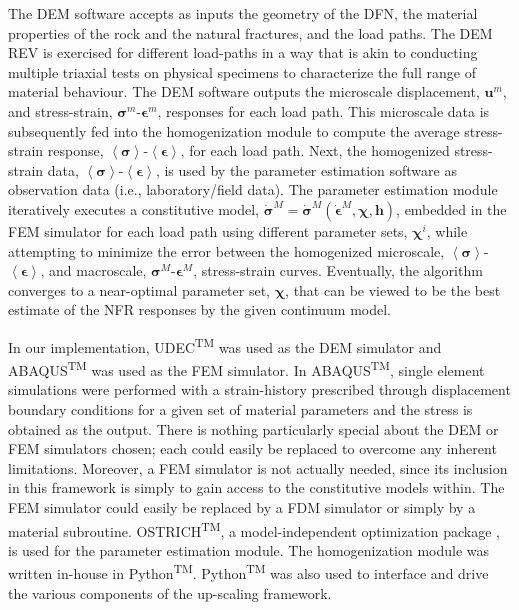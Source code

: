 The DEM software accepts as inputs the geometry of the DFN, the material properties of the rock and the natural fractures, and the load paths. The DEM REV is exercised for different load-paths in a way that is akin to conducting multiple triaxial tests on physical specimens to characterize the full range of material behaviour. The DEM software outputs the microscale displacement, $\mathbf{u}^m$, and stress-strain, $\boldsymbol{\sigma}^m$-$\boldsymbol{\epsilon}^m$, responses for each load path.  This microscale data is subsequently fed into the homogenization module to compute the average stress-strain response, $\left<\boldsymbol{\sigma}\right>$-$\left<\boldsymbol{\epsilon}\right>$,  for each load path. Next, the homogenized stress-strain data, $\left<\boldsymbol{\sigma}\right>$-$\left<\boldsymbol{\epsilon}\right>$, is used by the parameter estimation software as observation data (i.e., laboratory/field data). The parameter estimation module iteratively executes a constitutive model, $\dot{\boldsymbol{\sigma}}^M=\dot{\boldsymbol{\sigma}}^M\left(\dot{\boldsymbol{\epsilon}}^M, \boldsymbol{\chi},\mathbf{h}\right)$, embedded in the FEM simulator for each load path using different parameter sets, $\boldsymbol{\chi}^i$, while attempting to minimize the error between the homogenized microscale, $\left<\boldsymbol{\sigma}\right>$-$\left<\boldsymbol{\epsilon}\right>$, and macroscale, $\boldsymbol{\sigma}^M$-$\boldsymbol{\epsilon}^M$,  stress-strain curves. Eventually, the algorithm converges to a near-optimal parameter set, $\boldsymbol{\chi}$, that can be viewed to be the best estimate of the NFR responses by the given continuum model. 

In our implementation, UDEC\textsuperscript{TM} was used as the DEM simulator and ABAQUS\textsuperscript{TM} was used as the FEM simulator. In ABAQUS\textsuperscript{TM}, single element simulations were performed with a strain-history prescribed through displacement boundary conditions for a given set of material parameters and the stress is obtained as the output. There is nothing particularly special about the DEM or FEM simulators chosen; each could easily be replaced to overcome any inherent limitations.  Moreover, a FEM simulator is not actually needed, since its inclusion in this framework is simply to gain access to the constitutive models within. The FEM simulator could easily be replaced by a FDM simulator or simply by a material subroutine.  OSTRICH\textsuperscript{TM}, a model-independent optimization package \citep{matott_ostrich:_2016}, is used for the parameter estimation module. The homogenization module was written in-house in Python\textsuperscript{TM}. Python\textsuperscript{TM} was also used to interface and drive the various components of the up-scaling framework.

